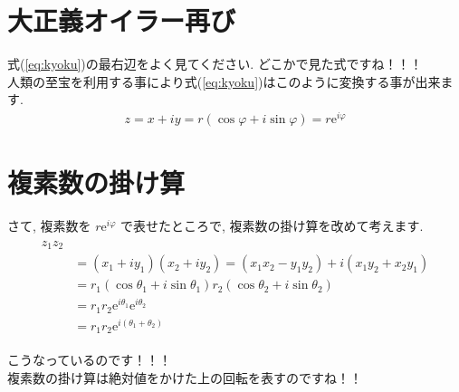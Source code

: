 \documentclass[11pt,a4paper]{jreport}
\begin{document}
\section{大正義オイラー再び}
式(\ref{eq:kyoku})の最右辺をよく見てください. どこかで見た式ですね！！！\\
人類の至宝を利用する事により式(\ref{eq:kyoku})はこのように変換する事が出来ます.\\
\begin{eqnarray}
z = x + iy = r(\cos\varphi + i\sin \varphi) = r \mathrm{e}^{i\varphi}
\end{eqnarray}

\section{複素数の掛け算}
さて, 複素数を $r\mathrm{e}^{i\varphi}$ で表せたところで, 複素数の掛け算を改めて考えます.\\
\begin{eqnarray}
\begin{split}
z_1 z_2\\
& = (x_1 + iy_1)(x_2 + iy_2) = (x_1 x_2 - y_1 y_2) + i(x_1 y_2 +x_2 y_1)\\
&= r_1(\cos\theta_1 + i\sin\theta_1)r_2(\cos\theta_2 + i\sin\theta_2)\\
&= r_1r_2\mathrm{e}^{i\theta_1} \mathrm{e}^{i\theta_2}\\
&= r_1r_2\mathrm{e}^{i(\theta_1 + \theta_2)}
\end{split}
\end{eqnarray}

こうなっているのです！！！\\
複素数の掛け算は絶対値をかけた上の回転を表すのですね！！
\end{document}
